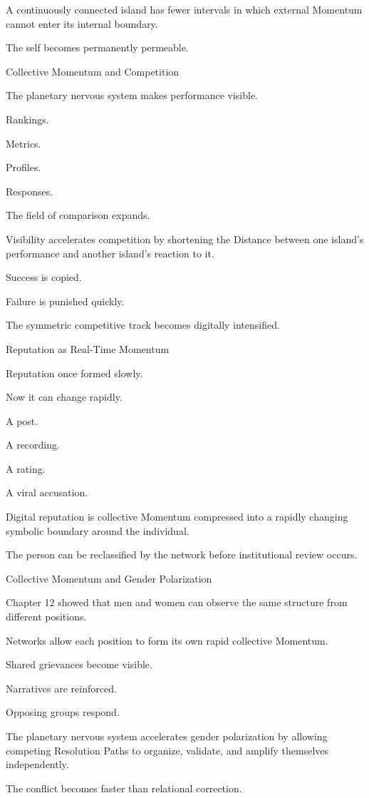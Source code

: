 A continuously connected island has fewer intervals in which external Momentum cannot enter its internal boundary.

The self becomes permanently permeable.

Collective Momentum and Competition

The planetary nervous system makes performance visible.

Rankings.

Metrics.

Profiles.

Responses.

The field of comparison expands.

Visibility accelerates competition by shortening the Distance between one island’s performance and another island’s reaction to it.

Success is copied.

Failure is punished quickly.

The symmetric competitive track becomes digitally intensified.

Reputation as Real-Time Momentum

Reputation once formed slowly.

Now it can change rapidly.

A post.

A recording.

A rating.

A viral accusation.

Digital reputation is collective Momentum compressed into a rapidly changing symbolic boundary around the individual.

The person can be reclassified by the network before institutional review occurs.

Collective Momentum and Gender Polarization

Chapter 12 showed that men and women can observe the same structure from different positions.

Networks allow each position to form its own rapid collective Momentum.

Shared grievances become visible.

Narratives are reinforced.

Opposing groups respond.

The planetary nervous system accelerates gender polarization by allowing competing Resolution Paths to organize, validate, and amplify themselves independently.

The conflict becomes faster than relational correction.

